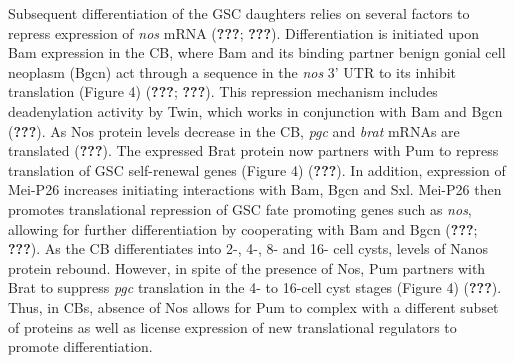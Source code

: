 \documentclass[12pt,oneside]{reedthesis}
\begin{document}
Subsequent differentiation of the GSC daughters relies on several
factors to repress expression of \emph{nos} mRNA ({\textbf{???}}; {\textbf{???}}). Differentiation is initiated upon Bam expression in the
CB, where Bam and its binding partner benign gonial cell neoplasm (Bgcn)
act through a sequence in the \emph{nos} 3' UTR to its inhibit translation
(Figure 4) ({\textbf{???}}; {\textbf{???}}). This repression mechanism
includes deadenylation activity by Twin, which works in conjunction with
Bam and Bgcn ({\textbf{???}}). As Nos protein levels decrease in the CB,
\emph{pgc} and \emph{brat} mRNAs are translated ({\textbf{???}}). The expressed
Brat protein now partners with Pum to repress translation of GSC
self-renewal genes (Figure 4) ({\textbf{???}}). In addition, expression
of Mei-P26 increases initiating interactions with Bam, Bgcn and Sxl.
Mei-P26 then promotes translational repression of GSC fate promoting
genes such as \emph{nos}, allowing for further differentiation by cooperating
with Bam and Bgcn ({\textbf{???}}; {\textbf{???}}). As the CB
differentiates into 2-, 4-, 8- and 16- cell cysts, levels of Nanos
protein rebound. However, in spite of the presence of Nos, Pum partners
with Brat to suppress \emph{pgc} translation in the 4- to 16-cell cyst stages
(Figure 4) ({\textbf{???}}). Thus, in CBs, absence of Nos allows for Pum
to complex with a different subset of proteins as well as license
expression of new translational regulators to promote differentiation.
\end{document}
